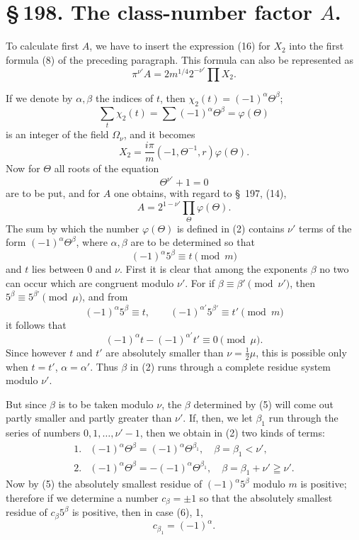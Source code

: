\documentclass[11pt]{article}
\begin{document}
\section*{\S\,198. The class-number factor $A$.}

To calculate first $A$, we have to insert the expression (16) for $X_2$ into the first formula (8) of the preceding paragraph. This formula can also be represented as
\begin{equation}
\pi^{\nu'}A=2m^{1/4}2^{-\nu'}\prod X_2.
\tag{1}
\end{equation}

If we denote by $\alpha,\beta$ the indices of $t$, then $\chi_2(t)=(-1)^\alpha\Theta^\beta$;
\begin{equation}
\sum_t\chi_2(t)=\sum(-1)^\alpha\Theta^\beta=\varphi(\Theta)
\tag{2}
\end{equation}
is an integer of the field $\Omega_\nu$, and it becomes
\[
X_2=\frac{i\pi}{m}(-1,\Theta^{-1},r)\varphi(\Theta).
\]
Now for $\Theta$ all roots of the equation
\begin{equation}
\Theta^{\nu'}+1=0
\tag{3}
\end{equation}
are to be put, and for $A$ one obtains, with regard to \S~197, (14),
\begin{equation}
A=2^{1-\nu'}\prod_\Theta\varphi(\Theta).
\tag{4}
\end{equation}
The sum by which the number $\varphi(\Theta)$ is defined in (2) contains $\nu'$ terms of the form $(-1)^\alpha\Theta^\beta$, where $\alpha,\beta$ are to be determined so that
\begin{equation}
(-1)^\alpha5^\beta\equiv t\pmod m
\tag{5}
\end{equation}
and $t$ lies between $0$ and $\nu$. First it is clear that among the exponents $\beta$ no two can occur which are congruent modulo $\nu'$. For if $\beta\equiv\beta'\pmod{\nu'}$, then $5^\beta\equiv5^{\beta'}\pmod\mu$, and from
\[
(-1)^\alpha5^\beta\equiv t,
\qquad
(-1)^{\alpha'}5^{\beta'}\equiv t'\pmod m
\]
it follows that
\[
(-1)^\alpha t-(-1)^{\alpha'}t'\equiv0\pmod\mu.
\]
Since however $t$ and $t'$ are absolutely smaller than $\nu=\frac12\mu$, this is possible only when $t=t'$, $\alpha=\alpha'$. Thus $\beta$ in (2) runs through a complete residue system modulo $\nu'$.

But since $\beta$ is to be taken modulo $\nu$, the $\beta$ determined by (5) will come out partly smaller and partly greater than $\nu'$. If, then, we let $\beta_1$ run through the series of numbers $0,1,\ldots,\nu'-1$, then we obtain in (2) two kinds of terms:
\begin{equation}
\begin{array}{ll}
1. & (-1)^\alpha\Theta^\beta=(-1)^\alpha\Theta^{\beta_1},\quad \beta=\beta_1<\nu',\\[1mm]
2. & (-1)^\alpha\Theta^\beta= -(-1)^\alpha\Theta^{\beta_1},\quad \beta=\beta_1+\nu'\geqq\nu'.
\end{array}
\tag{6}
\end{equation}
Now by (5) the absolutely smallest residue of $(-1)^\alpha5^\beta$ modulo $m$ is positive; therefore if we determine a number $c_\beta=\pm1$ so that the absolutely smallest residue of $c_\beta5^\beta$ is positive, then in case (6), 1,
\[
c_{\beta_1}=(-1)^\alpha.
\]
\end{document}
